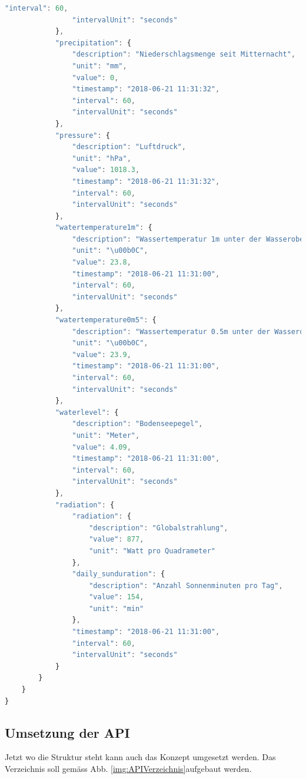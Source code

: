 \begin{lstlisting}[label=lst:Referenz,caption=Titel, language=JavaScript, style=htmlcssjs]
				"interval": 60,
				"intervalUnit": "seconds"
			},
			"precipitation": {
				"description": "Niederschlagsmenge seit Mitternacht",
				"unit": "mm",
				"value": 0,
				"timestamp": "2018-06-21 11:31:32",
				"interval": 60,
				"intervalUnit": "seconds"
			},
			"pressure": {
				"description": "Luftdruck",
				"unit": "hPa",
				"value": 1018.3,
				"timestamp": "2018-06-21 11:31:32",
				"interval": 60,
				"intervalUnit": "seconds"
			},
			"watertemperature1m": {
				"description": "Wassertemperatur 1m unter der Wasseroberfl\u00e4che",
				"unit": "\u00b0C",
				"value": 23.8,
				"timestamp": "2018-06-21 11:31:00",
				"interval": 60,
				"intervalUnit": "seconds"
			},
			"watertemperature0m5": {
				"description": "Wassertemperatur 0.5m unter der Wasseroberfl\u00e4che",
				"unit": "\u00b0C",
				"value": 23.9,
				"timestamp": "2018-06-21 11:31:00",
				"interval": 60,
				"intervalUnit": "seconds"
			},
			"waterlevel": {
				"description": "Bodenseepegel",
				"unit": "Meter",
				"value": 4.09,
				"timestamp": "2018-06-21 11:31:00",
				"interval": 60,
				"intervalUnit": "seconds"
			},
			"radiation": {
				"radiation": {
					"description": "Globalstrahlung",
					"value": 877,
					"unit": "Watt pro Quadrameter"
				},
				"daily_sunduration": {
					"description": "Anzahl Sonnenminuten pro Tag",
					"value": 154,
					"unit": "min"
				},
				"timestamp": "2018-06-21 11:31:00",
				"interval": 60,
				"intervalUnit": "seconds"
			}
		}
	}
}

\end{lstlisting}

\subsection{Umsetzung der API}

Jetzt wo die Struktur steht kann auch das Konzept umgesetzt werden. Das Verzeichnis soll gemäss Abb. \ref{img:APIVerzeichnis}aufgebaut werden.


